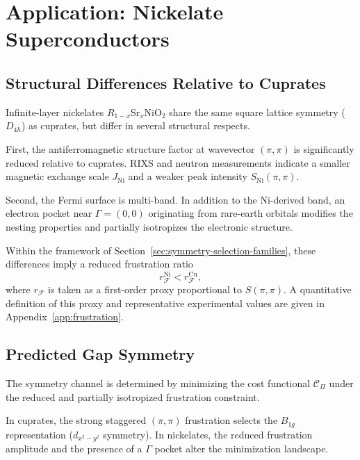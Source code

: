 \section{Application: Nickelate Superconductors}
  \label{sec:nickelates}

  \subsection{Structural Differences Relative to Cuprates}
    \label{subsec:nickelates-structure}

    Infinite-layer nickelates $R_{1-x}$Sr$_x$NiO$_2$
    share the same square lattice symmetry ($D_{4h}$)
    as cuprates,
    but differ in several structural respects.

    First,
    the antiferromagnetic structure factor
    at wavevector $(\pi,\pi)$
    is significantly reduced relative to cuprates.
    RIXS and neutron measurements indicate
    a smaller magnetic exchange scale
    $J_{\mathrm{Ni}}$
    and a weaker peak intensity
    $S_{\mathrm{Ni}}(\pi,\pi)$.

    Second,
    the Fermi surface is multi-band.
    In addition to the Ni-derived band,
    an electron pocket near $\Gamma=(0,0)$
    originating from rare-earth orbitals
    modifies the nesting properties
    and partially isotropizes the electronic structure.

    Within the framework of Section~\ref{sec:symmetry-selection-families},
    these differences imply a reduced
    frustration ratio
    \begin{equation}
      r_{\mathcal F}^{\mathrm{Ni}}
      <
      r_{\mathcal F}^{\mathrm{Cu}},
    \end{equation}
    where $r_{\mathcal F}$
    is taken as a first-order proxy
    proportional to $S(\pi,\pi)$.
    A quantitative definition of this proxy
    and representative experimental values
    are given in Appendix~\ref{app:frustration}.

  \subsection{Predicted Gap Symmetry}
    \label{subsec:nickelates-symmetry}

    The symmetry channel is determined
    by minimizing the cost functional
    $\mathcal{C}_{\Pi}$
    under the reduced and partially isotropized
    frustration constraint.

    In cuprates,
    the strong staggered $(\pi,\pi)$ frustration
    selects the $B_{1g}$ representation
    ($d_{x^2-y^2}$ symmetry).
    In nickelates,
    the reduced frustration amplitude
    and the presence of a $\Gamma$ pocket
    alter the minimization landscape.

